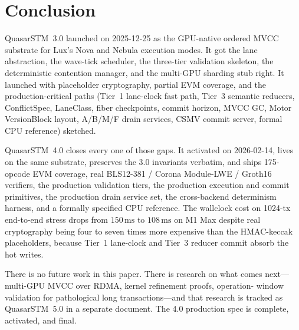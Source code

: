 \section{Conclusion}

\label{sec:conclusion}

QuasarSTM~3.0 launched on 2025-12-25 as the GPU-native ordered MVCC
substrate for Lux's Nova and Nebula execution modes. It got the lane
abstraction, the wave-tick scheduler, the three-tier validation
skeleton, the deterministic contention manager, and the multi-GPU
sharding stub right. It launched with placeholder cryptography, partial
EVM coverage, and the production-critical paths (Tier~1 lane-clock
fast path, Tier~3 semantic reducers, ConflictSpec, LaneClass, fiber
checkpoints, commit horizon, MVCC GC, Motor VersionBlock layout, A/B/M/F
drain services, CSMV commit server, formal CPU reference) sketched.

QuasarSTM~4.0 closes every one of those gaps. It activated on
2026-02-14, lives on the same substrate, preserves the 3.0 invariants
verbatim, and ships 175-opcode EVM coverage, real BLS12-381 / Corona
Module-LWE / Groth16 verifiers, the production validation tiers, the
production execution and commit primitives, the production drain
service set, the cross-backend determinism harness, and a formally
specified CPU reference. The wallclock cost on 1024-tx end-to-end
stress drops from $150\,\text{ms}$ to $108\,\text{ms}$ on M1 Max
despite real cryptography being four to seven times more expensive
than the HMAC-keccak placeholders, because Tier~1 lane-clock and
Tier~3 reducer commit absorb the hot writes.

There is no future work in this paper. There is research on what comes
next---multi-GPU MVCC over RDMA, kernel refinement proofs, operation-
window validation for pathological long transactions---and that
research is tracked as QuasarSTM~5.0 in a separate document. The 4.0
production spec is complete, activated, and final.


